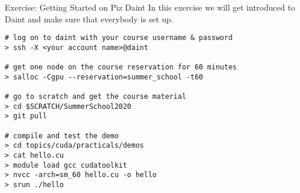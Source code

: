 \documentclass[aspectratio=43]{beamer}
\begin{document}
\begin{frame}[fragile]{Exercise: Getting Started on Piz Daint}
    In this exercise we will get introduced to Daint and make sure that everybody is set up.

    \begin{terminal}{}
        \begin{lstlisting}[style=terminal]
# log on to daint with your course username & password
> ssh -X <your account name>@daint

# get one node on the course reservation for 60 minutes
> salloc -Cgpu --reservation=summer_school -t60

# go to scratch and get the course material
> cd $SCRATCH/SummerSchool2020
> git pull

# compile and test the demo
> cd topics/cuda/practicals/demos
> cat hello.cu
> module load gcc cudatoolkit
> nvcc -arch=sm_60 hello.cu -o hello
> srun ./hello
        \end{lstlisting}
    \end{terminal}
\end{frame}
\end{document}
